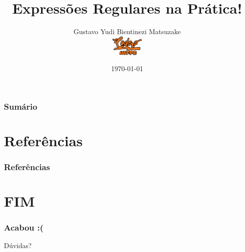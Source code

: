 \documentclass{beamer}
\title[Expressões Regulares]{Expressões Regulares na Prática!} %
\author[Yudi Matsuzake]{Gustavo Yudi Bientinezi Matsuzake\\
			\includegraphics[height=1cm,width=2cm]{./imagens/coders.png}} %
\institute[UTFPR] %
{
Universidade Tecnológica Federal do Paraná\\ %
Coders UTFPR\\
\medskip
\textit{matsuzake@alunos.utfpr.edu.br} %
\url{https://github.com/yudi-matsuzake/regex-coders}
}
\date{\today} %
\begin{document}
\begin{frame}
\titlepage %
\end{frame}

\newcommand{\sumario}{
\begin{frame}
\frametitle{Sumário} %
\tableofcontents %
\end{frame}
}

\sumario







\section{Referências}

\begin{frame}
\frametitle{Referências}

\end{frame}


\section{FIM}
\begin{frame}
\frametitle{Acabou :(}
\centerline{Dúvidas?}


\titlepage
\end{frame}

\end{document}
